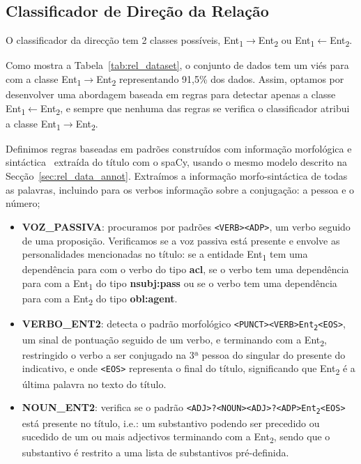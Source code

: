 \documentclass[a4paper, twocolumn, 11pt, twoside]{article}
\begin{document}
\subsection{Classificador de Direção da Relação}
\label{subsec:rel_direction}

O classificador da direcção tem 2 classes possíveis, Ent\textsubscript{1}$\rightarrow$Ent\textsubscript{2} ou Ent\textsubscript{1}$\leftarrow$Ent\textsubscript{2}. 

Como mostra a Tabela~\ref{tab:rel_dataset}, o conjunto de dados tem um viés para com a classe Ent\textsubscript{1}$\rightarrow$Ent\textsubscript{2} representando 91,5\% dos dados. Assim, optamos por desenvolver uma abordagem baseada em regras para detectar apenas a classe Ent\textsubscript{1}$\leftarrow$Ent\textsubscript{2}, e sempre que nenhuma das regras se verifica o classificador atribui a classe Ent\textsubscript{1}$\rightarrow$Ent\textsubscript{2}.

Definimos regras baseadas em padrões construídos com informação morfológica e sintáctica~\citep{nivre-etal-2020-universal} extraída do título com o spaCy, usando o mesmo modelo descrito na Secção~\ref{sec:rel_data_annot}. Extraímos a informação morfo-sintáctica de todas as palavras, incluindo para os verbos informação sobre a conjugação: a pessoa e o número;

\begin{itemize}

\item \textbf{VOZ\_PASSIVA}: procuramos por padrões \texttt{<VERB><ADP>}, um verbo seguido de uma proposição. Verificamos se a voz passiva está presente e envolve as personalidades mencionadas no título: se a entidade Ent\textsubscript{1} tem uma dependência para com o verbo do tipo \textbf{acl}, se o verbo tem uma dependência para com a Ent\textsubscript{1} do tipo \textbf{nsubj:pass} ou se o verbo tem uma dependência para com a Ent\textsubscript{2} do tipo \textbf{obl:agent}. 

\item \textbf{VERBO\_ENT2}: detecta o padrão morfológico \texttt{<PUNCT><VERB>Ent\textsubscript{2}<EOS>}, um sinal de pontuação seguido de um verbo, e terminando com a Ent\textsubscript{2}, restringido o verbo a ser conjugado na 3ª pessoa do singular do presente do indicativo, e onde \texttt{<EOS>} representa o final do título, significando que Ent\textsubscript{2} é a última palavra no texto do título.

\item \textbf{NOUN\_ENT2}: verifica se o padrão \texttt{<ADJ>?<NOUN><ADJ>?<ADP>Ent\textsubscript{2}<EOS>} está presente no título, i.e.: um substantivo podendo ser precedido ou sucedido de um ou mais adjectivos terminando com a Ent\textsubscript{2}, sendo que o substantivo é restrito a uma lista de substantivos pré-definida.
\end{itemize}
\end{document}
